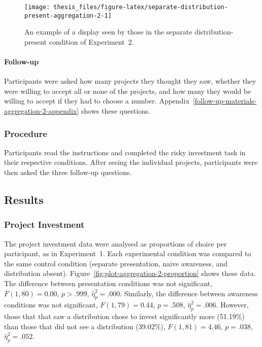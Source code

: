 \documentclass[a4paper, nobind]{templates/ociamthesis}
\theoremstyle{definition}
\theoremstyle{definition}
\theoremstyle{definition}
\theoremstyle{definition}
\theoremstyle{remark}
\begin{document}
\begin{figure}
\texttt{[image: thesis\_files/figure-latex/separate-distribution-present-aggregation-2-1]} \caption{An example of a display seen by those in the separate distribution-present condition of Experiment~2.}\label{fig:separate-distribution-present-aggregation-2}
\end{figure}

\hypertarget{follow-up-aggregation-2}{%
\paragraph{Follow-up}\label{follow-up-aggregation-2}}

Participants were asked how many projects they thought they saw, whether they
were willing to accept all or none of the projects, and how many they would be
willing to accept if they had to choose a number.
Appendix~\ref{follow-up-materials-aggregation-2-appendix} shows these
questions.

\subsubsection{Procedure}

Participants read the instructions and completed the risky investment task in
their respective conditions. After seeing the individual projects, participants
were then asked the three follow-up questions.

\hypertarget{results-aggregation-2}{%
\subsection{Results}\label{results-aggregation-2}}

\subsubsection{Project Investment}

The project investment data were analysed as proportions of choice per
participant, as in Experiment~1. Each experimental condition was compared to the
same control condition (separate presentation, naive awareness, and distribution
absent). Figure~\ref{fig:plot-aggregation-2-proportion} shows these data. The
difference between presentation conditions was not significant,
\(F(1, 80) = 0.00\), \(p > .999\), \(\hat{\eta}^2_p = .000\). Similarly, the
difference between awareness conditions was not significant,
\(F(1, 79) = 0.44\), \(p = .508\), \(\hat{\eta}^2_p = .006\). However, those that that saw a
distribution chose to invest significantly more
(51.19\%) than those that did
not see a distribution
(39.02\%),
\(F(1, 81) = 4.46\), \(p = .038\), \(\hat{\eta}^2_p = .052\).
\end{document}
